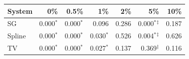 \begin{tabular}{lrrrrrr}\toprule
System & 0\% & 0.5\% & 1\% & 2\% & 5\% & 10\% \\\midrule
SG & 0.000$^*$ & 0.000$^*$ & 0.096 & 0.286 & 0.000$^*$$^\ddagger$ & 0.187 \\
Spline & 0.000$^*$ & 0.000$^*$ & 0.030$^*$ & 0.526 & 0.004$^*$$^\ddagger$ & 0.626 \\
TV & 0.000$^*$ & 0.000$^*$ & 0.027$^*$ & 0.137 & 0.369$^\ddagger$ & 0.116 \\
\bottomrule\end{tabular}
